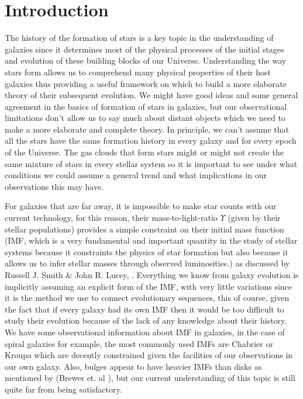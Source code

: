 \chapter{Introduction}

The history of the formation of stars is a key topic in the understanding of galaxies since it determines most of the physical processes of the initial stages and evolution of these building blocks of our Universe. Understanding the way stars form allows us to comprehend many physical properties of their host galaxies thus providing a useful framework on which to build a more elaborate theory of their subsequent evolution. We might have good ideas and some general agreement in the basics of formation of stars in galaxies, but our observational limitations don't allow us to say much about distant objects which we need to make a more elaborate and complete theory. In principle, we can't assume that all the stars have the same formation history in every galaxy and for every epoch of the Universe. The gas clouds that form stars might or might not create the same mixture of stars in every stellar system so it is important to see under what conditions we could assume a general trend and what implications in our observations this may have. 

For galaxies that are far away, it is impossible to make star counts with our current technology, for this reason, their mass-to-light-ratio $\Upsilon$ (given by their stellar populations) provides a simple constraint on their initial mass function (IMF, which is a very fundamental and important quantity in the study of stellar systems because it constraints the physics of star formation but also because it allows us to infer stellar masses through observed luminosities.) as discussed by Russell J. Smith \& John R. Lucey, \citeyear{Reference7}. Everything we know from galaxy evolution is implicitly assuming an explicit form of the IMF, with very little variations since it is the method we use to connect evolutionary sequences, this of course, given the fact that if every galaxy had its own IMF then it would be too difficult to study their evolution because of the lack of any knowledge about their history. We have some observational information about IMF in galaxies, in the case of spiral galaxies for example, the most commonly used IMFs are Chabrier or Kroupa which are decently constrained given the facilities of our observations in our own galaxy. Also, bulges appear to have heavier IMFs than disks as mentioned by (Brewer et. al \citeyear{Reference16}), but our current understanding of this topic is still quite far from being satisfactory.

